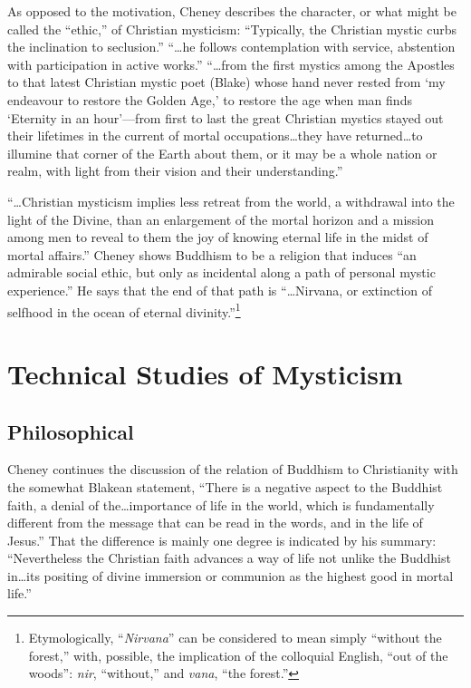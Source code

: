 As opposed to the motivation, Cheney describes the
character, or what might be called the \enquote{ethic,} of Christian
mysticism: \enquote{Typically, the Christian mystic curbs the inclination
to seclusion.} \enquote{\dots he follows contemplation with
service, abstention with participation in active works.}\supercite{cheney:walked-with-god}
\enquote{\dots from the first mystics among the Apostles to that latest
Christian mystic poet (Blake) whose hand never rested from
\enquote*{my endeavour to restore the Golden Age,} to restore the age
when man finds \enquote*{Eternity in an hour}---from first to last the
great Christian mystics stayed out their lifetimes in the
current of mortal occupations\dots they have returned\dots to
illumine that corner of the Earth about them, or it may be
a whole nation or realm, with light from their vision and
their understanding.}\supercite{cheney:walked-with-god}

\enquote{\dots Christian mysticism implies less retreat from the
world, a withdrawal into the light of the Divine, than an
enlargement of the mortal horizon and a mission among men to
reveal to them the joy of knowing eternal life in the midst
of mortal affairs.}\supercite{cheney:walked-with-god}
Cheney shows Buddhism to be a religion that induces \enquote{an admirable social ethic, but only as incidental
along a path of personal mystic experience.} He says that
the end of that path is \enquote{\dots Nirvana, or extinction of selfhood
in the ocean of eternal divinity.}\footnote{Etymologically, \enquote{\emph{Nirvana}} can be considered to mean simply \enquote{without the forest,} with, possible, the implication of the colloquial English, \enquote{out of the woods}: \emph{nir}, \enquote{without,} and \emph{vana}, \enquote{the forest.}\supercite{heinrich:philosophies-india}}

\section{Technical Studies of Mysticism}

\subsection{Philosophical}

Cheney continues the discussion of the relation of Buddhism
to Christianity with the somewhat Blakean statement, \enquote{There is a negative aspect to the Buddhist faith, a denial
of the\dots importance of life in the world, which is fundamentally
different from the message that can be read in the words, and
in the life of Jesus.}\supercite{cheney:walked-with-god}
That the difference is mainly one degree is indicated by his summary: \enquote{Nevertheless the
Christian faith advances a way of life not unlike the Buddhist
in\dots its positing of divine immersion or communion as
the highest good in mortal life.}\supercite{cheney:walked-with-god}


